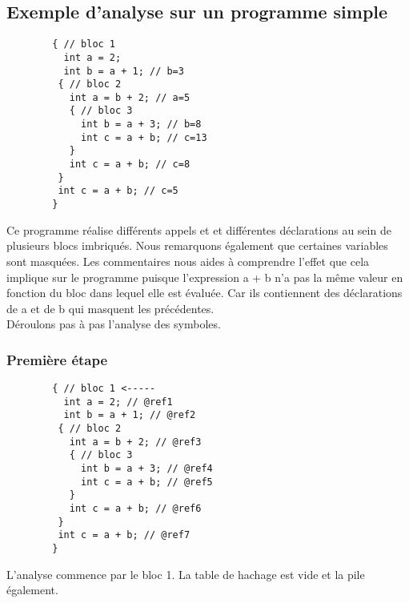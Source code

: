 \documentclass{../../res/univ-projet}
\begin{document}
  \subsection{Exemple d'analyse sur un programme simple}
    \begin{multicols}{2}
        
        \begin{verbatim}
        { // bloc 1
          int a = 2;
          int b = a + 1; // b=3
         { // bloc 2
           int a = b + 2; // a=5
           { // bloc 3
             int b = a + 3; // b=8
             int c = a + b; // c=13
           }
           int c = a + b; // c=8
         }
         int c = a + b; // c=5
        }

        \end{verbatim}

      \columnbreak
        Ce programme réalise différents appels et et différentes déclarations au sein de plusieurs blocs imbriqués. Nous remarquons également que certaines variables sont masquées. Les commentaires nous aides à comprendre l'effet que cela implique sur le programme puisque l'expression a + b n'a pas la même valeur en fonction du bloc dans lequel elle est évaluée. Car ils contiennent des déclarations de a et de b qui masquent les précédentes.\\

        Déroulons pas à pas l'analyse des symboles.
       
    \end{multicols}
    \subsubsection{Première étape}
    \begin{multicols}{2}
        
        \begin{verbatim}
        { // bloc 1 <-----
          int a = 2; // @ref1
          int b = a + 1; // @ref2
         { // bloc 2
           int a = b + 2; // @ref3
           { // bloc 3
             int b = a + 3; // @ref4
             int c = a + b; // @ref5
           }
           int c = a + b; // @ref6
         }
         int c = a + b; // @ref7
        }

        \end{verbatim}

      \columnbreak
        L'analyse commence par le bloc 1. La table de hachage est vide et la pile également.
      \end{multicols}
\end{document}
